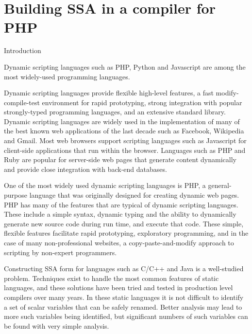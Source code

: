 \chapter{Building SSA in a compiler for PHP\\ }

\providecommand{\phc}{PHC}
\providecommand{\php}[1]{\textsf{#1}}
\providecommand{\pbterm}[1]{\textsf{#1}}
\providecommand{\chref}[1]{Chapter~#1}
\providecommand{\secref}[1]{Chapter~#1}
\providecommand{\figref}[1]{Figure~#1}
\providecommand{\var}[1]{$\$#1$}
\providecommand{\comnt}[1]

\section{Introduction}

Dynamic scripting languages such as PHP, Python and Javascript are
among the most widely-used programming languages.

Dynamic scripting languages provide flexible high-level features, a
fast modify-compile-test environment for rapid prototyping, strong
integration with popular strongly-typed programming languages, and an
extensive standard library.  Dynamic scripting languages are widely
used in the implementation of many of the best known web applications
of the last decade such as Facebook, Wikipedia and Gmail. Most web
browsers support scripting languages such as Javascript for
client-side applications that run within the browser. Languages such
as PHP and Ruby are popular for server-side web pages that generate
content dynamically and provide close integration with back-end
databases.

One of the most widely used dynamic scripting languages is PHP, a
general-purpose language that was originally designed for creating
dynamic web pages.  PHP has many of the features that are typical of
dynamic scripting languages.  These include a simple syntax, dynamic
typing and the ability to dynamically generate new source code during
run time, and execute that code. These simple, flexible features
facilitate rapid prototyping, exploratory programming, and in the case
of many non-professional websites, a copy-paste-and-modify approach to
scripting by non-expert programmers.

Constructing SSA form for languages such as C/C++ and Java is a
well-studied problem. Techniques exist to handle the most common
features of static languages, and these solutions have been tried and
tested in production level compilers over many years.  In these static
languages it is not difficult to identify a set of scalar variables
that can be safely renamed.  Better analysis may lead to more such
variables being identified, but significant numbers of such variables
can be found with very simple analysis.

